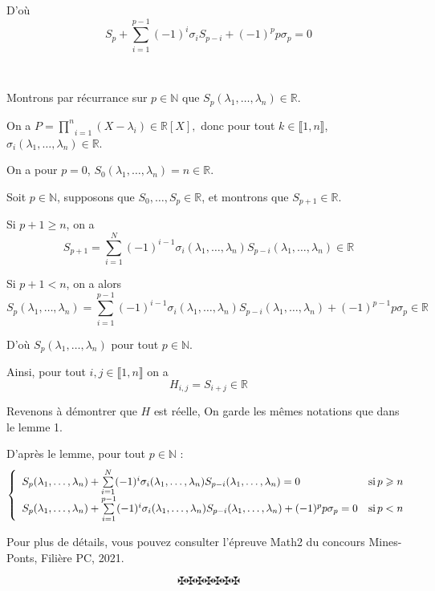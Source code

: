 D'o{\`u}
\[ S_p + \underset{i = 1}{\overset{p - 1}{\sum}} (- 1)^i \sigma_i S_{p - i} +
   (- 1)^p p \sigma_p = 0 \]


\

Montrons par r{\'e}currance sur $p \in \mathbb{N}$ que $S_p (\lambda_1,
\ldots, \lambda_n) \in \mathbb{R}$.

On a $P = \underset{i = 1}{\overset{n}{\prod}} (X - \lambda_i) \in \mathbb{R}
[X] \underset{}{\overset{}{}},$ donc pour tout $k \in \llbracket 1, n
\rrbracket$, $\sigma_i (\lambda_1, \ldots, \lambda_n) \in \mathbb{R}$.

On a pour $p = 0$, $S_0 (\lambda_1, \ldots, \lambda_n) = n \in \mathbb{R}$.

Soit $p \in \mathbb{N}$, supposons que $S_0, \ldots, S_p \in \mathbb{R}$, et
montrons que $S_{p + 1} \in \mathbb{R}$.

Si $p + 1 \geqslant n$, on a
\[ S_{p + 1} = \underset{i = 1}{\overset{N}{\sum}} (- 1)^{i - 1} \sigma_i
   (\lambda_1, \ldots, \lambda_n) S_{p - i} (\lambda_1, \ldots, \lambda_n) \in
   \mathbb{R} \]


Si $p + 1 < n$, on a alors
\[ S_p (\lambda_1, \ldots, \lambda_n) = \underset{i = 1}{\overset{p -
   1}{\sum}} (- 1)^{i - 1} \sigma_i (\lambda_1, \ldots, \lambda_n) S_{p - i}
   (\lambda_1, \ldots, \lambda_n) + (- 1)^{p - 1} p \sigma_p \in \mathbb{R} \]


D'o{\`u} $S_p (\lambda_1, \ldots, \lambda_n)$ pour tout $p \in \mathbb{N}$.

Ainsi, pour tout $i, j \in \llbracket 1, n \rrbracket$ on a
\[ H_{i, j} = S_{i + j} \in \mathbb{R} \]


Revenons {\`a} d{\'e}montrer que $H$ est r{\'e}elle, On garde les m{\^e}mes
notations que dans le lemme 1.

D'apr{\`e}s le lemme, pour tout $p \in \mathbb{N}$ :
\[ \left\{\begin{array}{ll}
     S_p (\lambda_1, \ldots, \lambda_n) + \underset{i = 1}{\overset{N}{\sum}}
     (- 1)^i \sigma_i (\lambda_1, \ldots, \lambda_n) S_{p - i} (\lambda_1,
     \ldots, \lambda_n) = 0 & \operatorname{si} p \geqslant n\\
     S_p (\lambda_1, \ldots, \lambda_n) + \underset{i = 1}{\overset{p -
     1}{\sum}} (- 1)^i \sigma_i (\lambda_1, \ldots, \lambda_n) S_{p - i}
     (\lambda_1, \ldots, \lambda_n) + (- 1)^p p \sigma_p = 0 & \operatorname{si} p < n
   \end{array}\right. \]



Pour plus de d{\'e}tails, vous pouvez consulter l'{\'e}preuve Math2 du
concours Mines-Ponts, Fili{\`e}re PC, 2021.

\[ \maltese \maltese \maltese \maltese \maltese \maltese \maltese \]